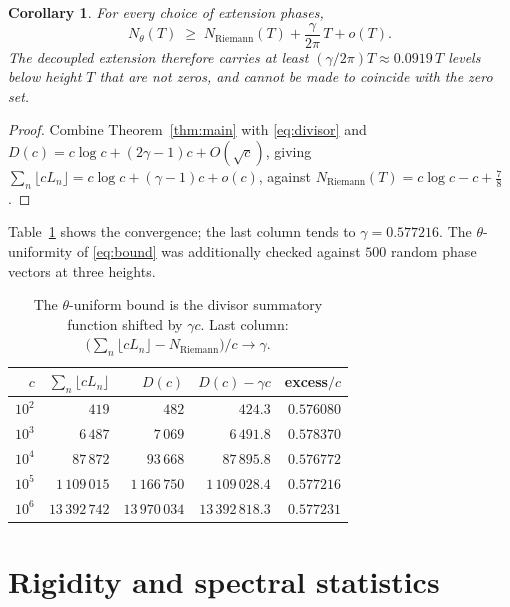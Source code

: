 \documentclass[11pt,a4paper]{article}
\newtheorem{corollary}[theorem]{Corollary}
\theoremstyle{remark}
\begin{document}
\begin{corollary}\label{cor:main}
For every choice of extension phases,
\begin{equation}\label{eq:excess}
N_\theta(T)\;\ge\;N_{\mathrm{Riemann}}(T)+\frac{\gamma}{2\pi}\,T+o(T).
\end{equation}
The decoupled extension therefore carries at least $(\gamma/2\pi)T\approx0.0919\,T$ levels below
height $T$ that are not zeros, and cannot be made to coincide with the zero set.
\end{corollary}

\begin{proof}
Combine Theorem~\ref{thm:main} with \eqref{eq:divisor} and
$D(c)=c\log c+(2\gamma-1)c+O(\sqrt c)$, giving
$\sum_n\lfloor cL_n\rfloor=c\log c+(\gamma-1)c+o(c)$, against
$N_{\mathrm{Riemann}}(T)=c\log c-c+\frac78$.
\end{proof}

Table~\ref{tab:divisor} shows the convergence; the last column tends to $\gamma=0.577216$. The
$\theta$-uniformity of \eqref{eq:bound} was additionally checked against $500$ random phase vectors
at three heights.

\begin{table}[h]
\centering
\begin{tabular}{rrrrr}
\toprule
$c$ & $\sum_n\lfloor cL_n\rfloor$ & $D(c)$ & $D(c)-\gamma c$ & excess$/c$\\
\midrule
$10^{2}$ & $419$ & $482$ & $424.3$ & $0.576080$\\
$10^{3}$ & $6\,487$ & $7\,069$ & $6\,491.8$ & $0.578370$\\
$10^{4}$ & $87\,872$ & $93\,668$ & $87\,895.8$ & $0.576772$\\
$10^{5}$ & $1\,109\,015$ & $1\,166\,750$ & $1\,109\,028.4$ & $0.577216$\\
$10^{6}$ & $13\,392\,742$ & $13\,970\,034$ & $13\,392\,818.3$ & $0.577231$\\
\bottomrule
\end{tabular}
\caption{The $\theta$-uniform bound is the divisor summatory function shifted by $\gamma c$.
Last column: $\bigl(\sum_n\lfloor cL_n\rfloor-N_{\mathrm{Riemann}}\bigr)/c\to\gamma$.}
\label{tab:divisor}
\end{table}

\section{Rigidity and spectral statistics}\label{sec:stats}
\end{document}
